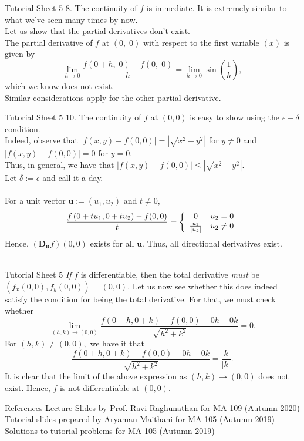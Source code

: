 \documentclass[aspectratio=169]{beamer}
\begin{document}
\begin{frame}{Tutorial Sheet 5}
	8. The continuity of $f$ is immediate. It is extremely similar to what we've seen many times by now. \\
	Let us show that the partial derivatives don't exist. \\
	The partial derivative of $f$ at $(0,\;0)$ with respect to the first variable $(x)$ is given by
	\[\lim_{h\to 0}\frac{f(0 + h,\; 0) - f(0,\;0)}{h} = \lim_{h\to 0}\sin\left(\frac{1}{h}\right),\]
	which we know does not exist. \\
	Similar considerations apply for the other partial derivative.
\end{frame}

\begin{frame}{Tutorial Sheet 5}
	10. The continuity of $f$ at $(0, 0)$ is easy to show using the $\epsilon-\delta$ condition.\\
	Indeed, observe that $|f(x, y) - f(0, 0)| = \left|\sqrt{x^2 + y^2}\right|$ for $y \neq 0$ and $|f(x, y) - f(0, 0)| = 0$ for $y = 0.$\\
	Thus, in general, we have that $|f(x, y) - f(0, 0)| \le \left|\sqrt{x^2 + y^2}\right|.$ \\
	Let $\delta := \epsilon$ and call it a day.\\~\\
	For a unit vector $\textbf{u} := (u_1, u_2)$ and $t \neq 0,$
	\[\frac{f\left(0+t u_{1}, 0+t u_{2}\right)-f(0,0)}{t} = \left\{
		\begin{array}{c c}
			0 & u_2 = 0\\
			\frac{u_2}{|u_2|} & u_2 \neq 0
		\end{array}
	\right.\]
	Hence, $\left(\mathbf{D_u} f\right)(0,0)$ exists for all $\textbf{u}.$ Thus, all directional derivatives exist.\\~\\
\end{frame}

\begin{frame}{Tutorial Sheet 5}
	\emph{If} $f$ is differentiable, then the total derivative \emph{must} be $(f_x(0, 0), f_y(0, 0)) = (0, 0).$ Let us now see whether this does indeed satisfy the condition for being the total derivative. For that, we must check whether
	\[\lim _{(h, k) \rightarrow(0,0)} \frac{f\left(0+h, 0+k\right)-f\left(0, 0\right)-0 h-0 k}{\sqrt{h^{2}+k^{2}}}=0.\]
	For $(h,k) \neq (0,0),$ we have it that
	\[\frac{f\left(0+h, 0+k\right)-f\left(0, 0\right)-0 h-0 k}{\sqrt{h^{2}+k^{2}}} = \frac{k}{|k|}.\]
	It is clear that the limit of the above expression as $(h, k) \to (0, 0)$ does not exist. Hence, $f$ is not differentiable at $(0, 0).$
\end{frame}

\begin{frame}{References}
    Lecture Slides by Prof. Ravi Raghunathan for MA 109 (Autumn 2020) \\
    Tutorial slides prepared by Aryaman Maithani for MA 105 (Autumn 2019) \\
    Solutions to tutorial problems for MA 105 (Autumn 2019) \\
\end{frame}
\end{document}
